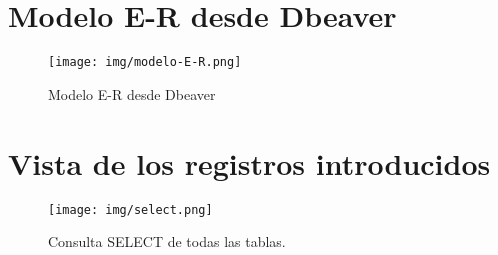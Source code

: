 \documentclass{article}
\begin{document}
    \section{Modelo E-R desde Dbeaver}
      \begin{figure}[h]
        \centering
        \texttt{[image: img/modelo-E-R.png]}
        \caption{Modelo E-R desde Dbeaver}
      \end{figure}
  \newpage
    \section{Vista de los registros introducidos}
      \begin{figure}[h]
        \centering
        \texttt{[image: img/select.png]}
        \caption{Consulta SELECT de todas las tablas.}
      \end{figure}

  \newpage
    \listoffigures
\end{document}
